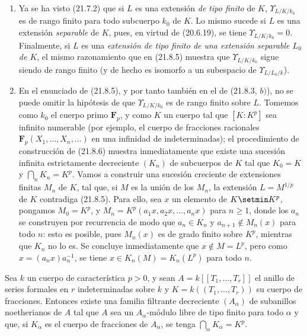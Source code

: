 \begin{remarks}[21.8.7]
\label{0.21.8.7-fr}
\begin{enumerate}
  \item[(i)] Ya se ha visto (21.7.2) que si $L$ es una extensión
  \emph{de tipo finito} de $K$, $\Upsilon_{L/K/k_0}$ es de rango finito para
  todo subcuerpo $k_0$ de $K$. Lo mismo sucede si $L$ es una extensión
  \emph{separable} de $K$, pues, en virtud de (20.6.19), se tiene
  $\Upsilon_{L/K/k_0}=0$. Finalmente, si $L$ es una \emph{extensión de tipo
  finito de una extensión separable $L_0$ de $K$}, el mismo razonamiento que
  en (21.8.5) muestra que $\Upsilon_{L/K/k_0}$ sigue siendo de rango finito
  (y de hecho es isomorfo a un subespacio de $\Upsilon_{L/L_0/k}$).

  \item[(ii)] En el enunciado de (21.8.5), y por tanto también en el de
  (21.8.3, $b)$), no se puede omitir la hipótesis de que
  $\Upsilon_{L/K/k_0}$ es de rango finito sobre $L$. Tomemos como $k_0$ el
  cuerpo primo $\mathbf F_p$, y como $K$ un cuerpo tal que $[K:K^p]$ sea
  infinito numerable (por ejemplo, el cuerpo de fracciones racionales
  $\mathbf F_p(X_1,\ldots,X_n,\ldots)$ en una infinidad de indeterminadas); el
  procedimiento de construcción de (21.8.6) muestra inmediatamente que existe
  una sucesión infinita estrictamente decreciente $(K_n)$ de subcuerpos de $K$
  tal que $K_0=K$ y $\bigcap_nK_n=K^p$. Vamos a construir una sucesión
  creciente de extensiones finitas $M_n$ de $K$, tal que, si $M$ es la unión
  de los $M_n$, la extensión $L=M^{1/p}$ de $K$ contradiga (21.8.5). Para
  ello, sea $x$ un elemento de $K\setmin K^p$, pongamos $M_0=K^p$, y
  $M_n=K^p(a_1x,a_2x,\ldots,a_nx)$ para $n\geqslant1$, donde los $a_n$ se
  construyen por recurrencia de modo que $a_n\in K_n$ y
  $a_{n+1}\notin M_n(x)$ para todo $n$: esto es posible, pues $M_n(x)$ es de
  grado finito sobre $K^p$, mientras que $K_n$ no lo es. Se concluye
  inmediatamente que $x\notin M=L^p$, pero como $x=(a_nx)a_n^{-1}$, se tiene
  $x\in K_n(M)=K_n(L^p)$ para todo $n$.
\end{enumerate}
\end{remarks}

\begin{proposition}[21.8.8]
\label{0.21.8.8-fr}
Sea $k$ un cuerpo de característica $p>0$, y sean
$A=k[[T_1,\ldots,T_r]]$ el anillo de series formales en $r$ indeterminadas
sobre $k$ y $K=k((T_1,\ldots,T_r))$ su cuerpo de fracciones. Entonces existe
una familia filtrante decreciente $(A_\alpha)$ de subanillos noetherianos de
$A$ tal que $A$ sea un $A_\alpha$-módulo libre de tipo finito para todo
$\alpha$ y que, si $K_\alpha$ es el cuerpo de fracciones de $A_\alpha$, se
tenga $\bigcap_\alpha K_\alpha=K^p$.
\end{proposition}

